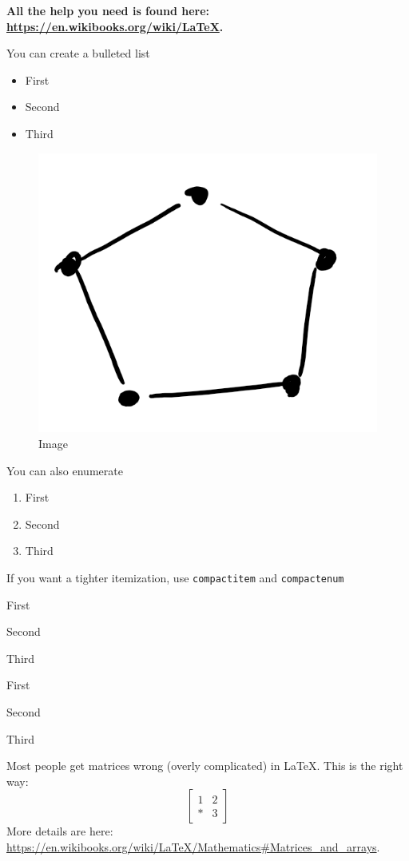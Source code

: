 \documentclass{amsart}
\begin{document}
\textbf{  All the help you need is found here: \url{https://en.wikibooks.org/wiki/LaTeX}. }


You can create a bulleted list
\begin{itemize}
\item First
\item Second
\item Third
\end{itemize}


\begin{figure}
  \includegraphics[width=0.5\linewidth]{figs/graph.png}
  \caption{Image}
\end{figure}
You can also enumerate
\begin{enumerate}
\item First
\item Second
\item Third
\end{enumerate}

If you want a tighter itemization, use \verb|compactitem| and \verb|compactenum|
\begin{compactitem}
\item First
\item Second
\item Third
\end{compactitem}

\begin{compactenum}
\item First
\item Second
\item Third
\end{compactenum}

Most people get matrices wrong (overly complicated) in \LaTeX. This is the right way:
\[ %
  \begin{bmatrix}
    1 & 2 \\
    \ast & 3
  \end{bmatrix}
\]
More details are here:
\url{https://en.wikibooks.org/wiki/LaTeX/Mathematics\#Matrices_and_arrays}.
\end{document}
